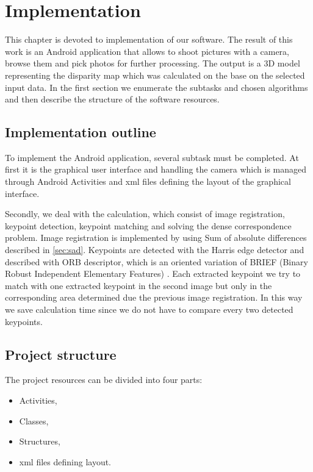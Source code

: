 
\chapter{Implementation}
\label{chap:implementation}

This chapter is devoted to implementation of our software.
The result of this work is an Android application that allows to shoot pictures with a camera, browse them and pick photos for further processing.
The output is a 3D model representing the disparity map which was calculated on the base on the selected input data.
In the first section we enumerate the subtasks and chosen algorithms and then describe the structure of the software resources.
 
\section{Implementation outline}
To implement the Android application, several subtask must be completed.
At first it is the graphical user interface and handling the camera which is managed through Android Activities and xml files defining the layout of the graphical interface.

Secondly, we deal with the calculation, which consist of image registration, keypoint detection, keypoint matching and solving the dense correspondence problem.
Image registration is implemented by using Sum of absolute differences described in \ref{sec:sad}.
Keypoints are detected with the Harris edge detector and described with ORB descriptor, which is an oriented variation of BRIEF (Binary Robust Independent Elementary Features) \cite{brief}.
Each extracted keypoint we try to match with one extracted keypoint in the second image but only in the corresponding area determined due the previous image registration.
In this way we save calculation time since we do not have to compare every two detected keypoints.


\section{Project structure}
The project resources can be divided into four parts:
\begin{itemize}
\item{Activities, }
\item{Classes, }
\item{Structures, }
\item{xml files defining layout.}
\end{itemize}


